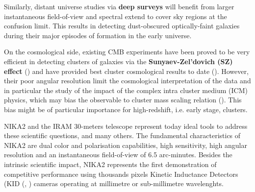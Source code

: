 \documentclass[]{aa} %
\begin{document}
Similarly, distant universe studies via \textbf{deep surveys} will benefit from larger instantaneous field-of-view and spectral extend to cover sky regions at the confusion limit. This results in detecting dust-obscured optically-faint galaxies during their major episodes of formation in the early universe. 

On the cosmological side, existing CMB experiments have been proved to be very efficient in detecting clusters of galaxies via the \textbf{Sunyaev-Zel\textquoteright dovich (SZ) effect} (\cite{plancksz1,plancksz2,actsz,sptsz}) and have provided best cluster cosmological results to date (\cite{plancknc1,plancksp1,plancknc2,plancksp2}). However, their poor angular resolution limit the cosmological interpretation of the data and in particular the study of the impact of the complex intra cluster medium (ICM) physics, which may bias the observable to cluster mass scaling relation (\cite{plancknc2}). This bias might be of particular importance for high-redshift, i.e. early stage, clusters. 

NIKA2 and the IRAM 30-meters telescope represent today ideal tools to address these scientific questions, and many others. The fundamental characteristics of NIKA2 are dual color and polarisation capabilities, high sensitivity, high angular resolution and an instantaneous field-of-view of 6.5 arc-minutes. Besides the intrinsic scientific impact, NIKA2 represents the first demonstration of competitive performance using thousands pixels Kinetic Inductance Detectors (KID (\cite{Day2003}, \cite{Doyle2010}) cameras operating at millimetre or sub-millimetre wavelenghts.

\end{document}
